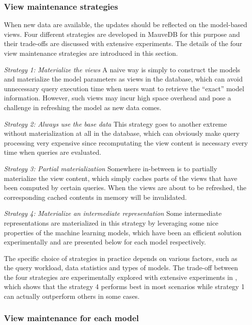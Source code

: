 \subsubsection{View maintenance strategies}
When new data are available, the updates should be reflected on the model-based views. Four different strategies are developed in MauveDB for this purpose and their trade-offs are discussed with extensive experiments. The details of the four view maintenance strategies are introduced in this section.

\textit{Strategy 1: Materialize the views}
A naive way is simply to construct the models and materialize the model parameters as views in the database, which can avoid unnecessary query execution time when users want to retrieve the ``exact'' model information. However, such views may incur high space overhead and pose a challenge in refreshing the model as new data comes.

\textit{Strategy 2: Always use the base data }
This strategy goes to another extreme without materialization at all in the database, which can obviously make query processing very expensive since recomputating the view content is necessary every time when queries are evaluated. 

\textit{Strategy 3: Partial materialization}
Somewhere in-between is to partially materialize the view content, which simply caches parts of the views that have been computed by certain queries. When the views are about to be refreshed, the corresponding cached contents in memory will be invalidated.

\textit{Strategy 4: Materialize an intermediate representation}
Some intermediate representations are materialized in this strategy by leveraging some nice properties of the machine learning models, which have been an efficient solution experimentally and are presented below for each model respectively.

The specific choice of strategies in practice depends on various factors, such as the query workload, data statistics and types of models. The trade-off between the four strategies are experimentally explored with extensive experiments in \cite{deshpande2006mauvedb}, which shows that the strategy 4 performs best in most scenarios while strategy 1 can actually outperform others in some cases.

\subsubsection{View maintenance for each model}\label{sec: view_maintenance_model}
